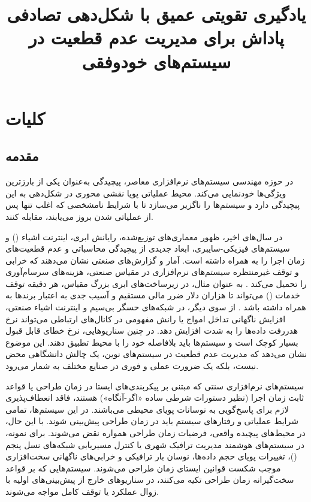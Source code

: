 \documentclass[oneside,openany,phd]{TMU-Thesis}
\title{یادگیری تقویتی عمیق با شکل‌دهی تصادفی پاداش برای مدیریت عدم قطعیت در سیستم‌های خودوفقی}
\begin{document}
\AutoPersianDigits
{}

\setcounter{chapter}{0}

\chapter{کلیات}

\section{مقدمه}

در حوزه مهندسی سیستم‌های نرم‌افزاری معاصر، پیچیدگی به‌عنوان یکی از بارزترین ویژگی‌ها خودنمایی می‌کند. محیط عملیاتی پویا نقشی محوری در شکل‌دهی به این پیچیدگی دارد و سیستم‌ها را ناگزیر می‌سازد تا با شرایط نامشخصی که اغلب تنها پس از عملیاتی شدن بروز می‌یابند، مقابله کنند. 

در سال‌های اخیر، ظهور معماری‌های توزیع‌شده، رایانش ابری، اینترنت اشیاء () و سیستم‌های فیزیکی-سایبری، ابعاد جدیدی از پیچیدگی محاسباتی و عدم قطعیت‌های زمان اجرا را به همراه داشته است. آمار و گزارش‌های صنعتی نشان می‌دهند که خرابی و توقف غیرمنتظره سیستم‌های نرم‌افزاری در مقیاس صنعتی، هزینه‌های سرسام‌آوری را تحمیل می‌کند \cite{gartner2014downtime}. به عنوان مثال، در زیرساخت‌های ابری بزرگ مقیاس، هر دقیقه توقف خدمات () می‌تواند تا هزاران دلار ضرر مالی مستقیم و آسیب جدی به اعتبار برندها به همراه داشته باشد \cite{gartner2014downtime}. از سوی دیگر، در شبکه‌های حسگر بی‌سیم و اینترنت اشیاء صنعتی، افزایش ناگهانی تداخل امواج یا رانش مفهومی در کانال‌های ارتباطی می‌تواند نرخ هدررفت داده‌ها را به شدت افزایش دهد. در چنین سناریوهایی، نرخ خطای قابل قبول بسیار کوچک است و سیستم‌ها باید بلافاصله خود را با محیط تطبیق دهند. این موضوع نشان می‌دهد که مدیریت عدم قطعیت در سیستم‌های نوین، یک چالش دانشگاهی محض نیست، بلکه یک ضرورت عملی و فوری در صنایع مختلف به شمار می‌رود.

سیستم‌های نرم‌افزاری سنتی که مبتنی بر پیکربندی‌های ایستا در زمان طراحی یا قواعد ثابت زمان اجرا (نظیر دستورات شرطی ساده «اگر-آنگاه») هستند، فاقد انعطاف‌پذیری لازم برای پاسخ‌گویی به نوسانات پویای محیطی می‌باشند. در این سیستم‌ها، تمامی شرایط عملیاتی و رفتارهای سیستم باید در زمان طراحی پیش‌بینی شوند. با این حال، در محیط‌های پیچیده واقعی، فرضیات زمان طراحی همواره نقض می‌شوند. برای نمونه، در سیستم‌های هوشمند مدیریت ترافیک شهری یا کنترل مسیریابی شبکه‌های نسل پنجم ()، تغییرات پویای حجم داده‌ها، نوسان بار ترافیکی و خرابی‌های ناگهانی سخت‌افزاری موجب شکست قوانین ایستای زمان طراحی می‌شوند. سیستم‌هایی که بر قواعد سخت‌گیرانه زمان طراحی تکیه می‌کنند، در سناریوهای خارج از پیش‌بینی‌های اولیه با زوال عملکرد یا توقف کامل مواجه می‌شوند.
\end{document}
